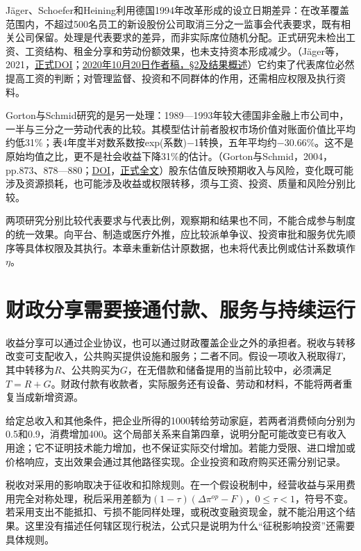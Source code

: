 \documentclass[UTF8,fontset=windows,12pt,a4paper,oneside,openany]{ctexbook}
\begin{document}
Jäger、Schoefer和Heining利用德国1994年改革形成的设立日期差异：在改革覆盖范围内，不超过500名员工的新设股份公司取消三分之一监事会代表要求，既有相关公司保留。处理是代表要求的差异，而非实际席位随机分配。正式研究未检出工资、工资结构、租金分享和劳动份额效果，也未支持资本形成减少。（Jäger等，2021，\href{https://doi.org/10.1093/qje/qjaa038}{正式DOI}；\href{https://jaeger.scholar.princeton.edu/document/91}{2020年10月20日作者稿，§2及结果概述}）它约束了代表席位必然提高工资的判断；对管理监督、投资和不同群体的作用，还需相应权限及执行资料。

Gorton与Schmid研究的是另一处理：1989—1993年较大德国非金融上市公司中，一半与三分之一劳动代表的比较。其模型估计前者股权市场价值对账面价值比平均约低31\%；表4年度半对数系数按exp(系数)\ensuremath{-}1转换，五年平均约\ensuremath{-}30.66\%。这不是原始均值之比，更不是社会收益下降31\%的估计。（Gorton与Schmid，2004，pp.873、878—880；\href{https://doi.org/10.1162/1542476042782260}{DOI}，\href{https://spinup-000d1a-wp-offload-media.s3.amazonaws.com/faculty/wp-content/uploads/sites/20/2020/12/Capital-Labor-and-the-Firm-A-Study-of-German-Codetermination.pdf}{正式全文}）股东估值反映预期收入与风险，变化既可能涉及资源损耗，也可能涉及收益或权限转移，须与工资、投资、质量和风险分别比较。

两项研究分别比较代表要求与代表比例，观察期和结果也不同，不能合成参与制度的统一效果。向平台、制造或医疗外推，应比较派单争议、投资审批和服务优先顺序等具体权限及其执行。本章未重新估计原数据，也未将代表比例或估计系数填作$\eta$。

\section{财政分享需要接通付款、服务与持续运行}

收益分享可以通过企业协议，也可以通过财政覆盖企业之外的承担者。税收与转移改变可支配收入，公共购买提供设施和服务；二者不同。假设一项收入税取得$T$，其中转移为$R$、公共购买为$G$，在无借款和储备提用的当前比较中，必须满足$T=R+G$。财政付款有收款者，实际服务还有设备、劳动和材料，不能将两者重复当成新增资源。

给定总收入和其他条件，把企业所得的1000转给劳动家庭，若两者消费倾向分别为0.5和0.9，消费增加400。这个局部关系来自第四章，说明分配可能改变已有收入用途；它不证明技术能力增加，也不保证实际交付增加。若能力受限、进口增加或价格响应，支出效果会通过其他路径实现。企业投资和政府购买还需分别记录。

税收对采用的影响取决于征收和扣除规则。在一个假设税制中，经营收益与采用费用完全对称处理，税后采用差额为$(1-\tau)(\Delta\pi^{op}-F)$，$0\leq\tau<1$，符号不变。若采用支出不能抵扣、亏损不能同样处理，或税改变融资现金，就不能沿用这个结果。这里没有描述任何辖区现行税法，公式只是说明为什么“征税影响投资”还需要具体规则。
\end{document}
